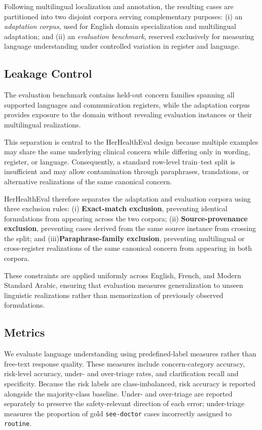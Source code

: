 Following multilingual localization and annotation, the resulting cases are
partitioned into two disjoint corpora serving complementary purposes: (i) an \emph{adaptation corpus}, used for English domain
    specialization and multilingual adaptation; and
    (ii) an \emph{evaluation benchmark}, reserved exclusively for
    measuring language understanding under controlled variation in register
    and language.



\subsection{Leakage Control}
\label{sec:leakage-control}
The evaluation benchmark contains held-out concern families spanning all
supported languages and communication registers, while the adaptation corpus
provides exposure to the domain without revealing evaluation instances or
their multilingual realizations.

This separation is central to the HerHealthEval design because multiple
examples may share the same underlying clinical concern while differing only
in wording, register, or language. Consequently, a standard row-level
train--test split is insufficient and may allow contamination through
paraphrases, translations, or alternative realizations of the same canonical
concern.

HerHealthEval therefore separates the adaptation and evaluation corpora using
three exclusion rules: (i) \textbf{Exact-match exclusion}, preventing identical formulations
    from appearing across the two corpora; (ii) \textbf{Source-provenance exclusion}, preventing cases derived
    from the same source instance from crossing the split; and (iii)\textbf{Paraphrase-family exclusion}, preventing multilingual or
    cross-register realizations of the same canonical concern from appearing
    in both corpora.


These constraints are applied uniformly across English, French, and Modern
Standard Arabic, ensuring that evaluation measures generalization to unseen
linguistic realizations rather than memorization of previously observed
formulations.


\subsection{Metrics}
\label{sec:metrics}

We evaluate language understanding using predefined-label measures rather
than free-text response quality. These measures include concern-category
accuracy, risk-level accuracy, under- and over-triage rates, and
clarification recall and specificity. Because the risk labels are
class-imbalanced, risk accuracy is reported alongside the majority-class
baseline. Under- and over-triage are reported separately to preserve the
safety-relevant direction of each error; under-triage measures the
proportion of gold \texttt{see-doctor} cases incorrectly assigned to
\texttt{routine}.

